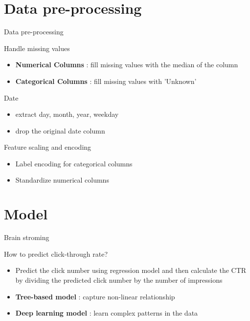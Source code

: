 \documentclass[compress,xcolor=table]{beamer}
\begin{document}
\section{Data pre-processing} 
\begin{frame}{Data pre-processing}
	\begin{block}{Handle missing values}
		\begin{itemize}
			\item \textbf{Numerical Columns} :  fill missing values with the median of the column
			\item \textbf{Categorical Columns} : fill missing values with 'Unknown'
		\end{itemize}
	\end{block}
	\begin{block}{Date}
		\begin{itemize}
			\item extract day, month, year, weekday
			\item drop the original date column
		\end{itemize}
	\end{block}
	\begin{block}{Feature scaling and encoding}
		\begin{itemize}
			\item Label encoding for categorical columns
			\item Standardize numerical columns
		\end{itemize}
	\end{block}
\end{frame}


\section{Model}
\begin{frame}{Brain stroming}
	\begin{block}{How to predict click-through rate?}
		\begin{itemize}
			\item Predict the click number using regression model and then calculate the CTR by dividing the predicted click number by the number of impressions
			\item \textbf{Tree-based model} : capture non-linear relationship
			\item \textbf{Deep learning model} : learn complex patterns in the data
		\end{itemize}
		
	\end{block}
	
\end{frame}
\end{document}

